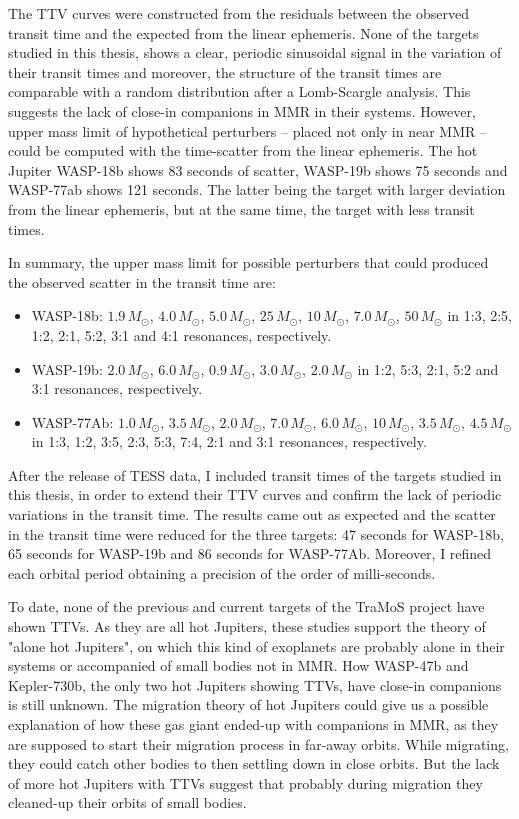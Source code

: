 The TTV curves were constructed from the residuals between the observed transit time and the expected from the linear ephemeris. None of the targets studied in this thesis, shows a clear, periodic sinusoidal signal in the variation of their transit times and moreover, the structure of the transit times are comparable with a random distribution after a Lomb-Scargle analysis. This suggests the lack of close-in companions in MMR in their systems. However, upper mass limit of hypothetical perturbers -- placed not only in near MMR -- could be computed with the time-scatter from the linear ephemeris. The hot Jupiter WASP-18b shows 83 seconds of scatter, WASP-19b shows 75 seconds and WASP-77ab shows 121 seconds. The latter being the target with larger deviation from the linear ephemeris, but at the same time, the target with less transit times.

In summary, the upper mass limit for possible perturbers that could produced the observed scatter in the transit time are:
\begin{itemize}
\item WASP-18b: $1.9\,M_{\odot}$, $4.0\,M_{\odot}$, $5.0\,M_{\odot}$, $25\,M_{\odot}$, $10\,M_{\odot}$, $7.0\,M_{\odot}$, $50\,M_{\odot}$ in 1:3, 2:5, 1:2, 2:1, 5:2, 3:1 and 4:1 resonances, respectively. 
\item WASP-19b: $2.0\,M_{\odot}$, $6.0\,M_{\odot}$, $0.9\,M_{\odot}$, $3.0\,M_{\odot}$, $2.0\,M_{\odot}$ in 1:2, 5:3, 2:1, 5:2 and 3:1 resonances, respectively. 
\item WASP-77Ab: $1.0\,M_{\odot}$, $3.5\,M_{\odot}$, $2.0\,M_{\odot}$, $7.0\,M_{\odot}$, $6.0\,M_{\odot}$, $10\,M_{\odot}$, $3.5\,M_{\odot}$, $4.5\,M_{\odot}$ in 1:3, 1:2, 3:5, 2:3, 5:3, 7:4, 2:1 and 3:1 resonances, respectively.
\end{itemize}

After the release of TESS data, I included transit times of the targets studied in this thesis, in order to extend their TTV curves and confirm the lack of periodic variations in the transit time. The results came out as expected and the scatter in the transit time were reduced for the three targets: 47 seconds for WASP-18b, 65 seconds for WASP-19b and 86 seconds for WASP-77Ab. Moreover, I refined each orbital period obtaining a precision of the order of milli-seconds. 

To date, none of the previous and current targets of the TraMoS project have shown TTVs. As they are all hot Jupiters, these studies support the theory of "alone hot Jupiters", on which this kind of exoplanets are probably alone in their systems or accompanied of small bodies not in MMR. How WASP-47b and Kepler-730b, the only two hot Jupiters showing TTVs, have close-in companions is still unknown. The migration theory of hot Jupiters could give us a possible explanation of how these gas giant ended-up with companions in MMR, as they are supposed to start their migration process in far-away orbits. While migrating, they could catch other bodies to then settling down in close orbits. But the lack of more hot Jupiters with TTVs suggest that probably during migration they cleaned-up their orbits of small bodies. 

